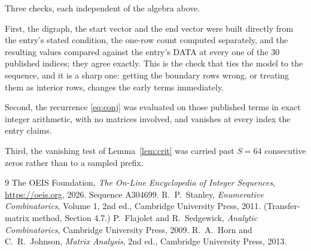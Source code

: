 \documentclass[11pt,a4paper]{article}
\theoremstyle{plain}
\theoremstyle{definition}
\begin{document}
Three checks, each independent of the algebra above.

First, the digraph, the start vector and the end vector were built directly from the
entry's stated condition, the one-row count computed separately, and the resulting values
compared against the entry's DATA at every one of the $30$ published indices; they
agree exactly. This is the check that ties the model to the sequence, and it is a sharp one:
getting the boundary rows wrong, or treating them as interior rows, changes the early terms
immediately.

Second, the recurrence \eqref{eq:conj} was evaluated on those published terms in exact
integer arithmetic, with no matrices involved, and vanishes at every index the entry claims.

Third, the vanishing test of Lemma~\ref{lem:crit} was carried past $S=64$ consecutive
zeros rather than to a sampled prefix.

\begin{thebibliography}{9}
 The OEIS Foundation, \emph{The On-Line Encyclopedia of Integer
Sequences}, \url{https://oeis.org}, 2026. Sequence A304699.
 R.~P.~Stanley, \emph{Enumerative Combinatorics}, Volume 1, 2nd ed.,
Cambridge University Press, 2011. (Transfer-matrix method, Section 4.7.)
 P.~Flajolet and R.~Sedgewick, \emph{Analytic Combinatorics}, Cambridge
University Press, 2009.
 R.~A.~Horn and C.~R.~Johnson, \emph{Matrix Analysis}, 2nd ed., Cambridge
University Press, 2013.
\end{thebibliography}
\end{document}
